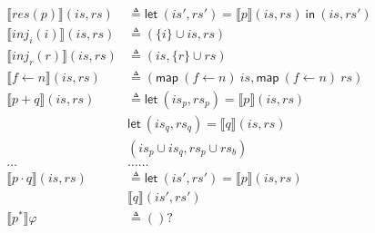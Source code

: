 \documentclass[12pt, letterpaper]{article}
\begin{document}
\begin{align*}
			\\
		\llbracket res(p) \rrbracket(\mathit{is}, \mathit{rs})
			& \triangleq
		\mathsf{let}\ (\mathit{is}',\mathit{rs}')
                = \llbracket p\rrbracket(\mathit{is}, \mathit{rs})\ 
                \mathsf{in}\ (\mathit{is},\mathit{rs}')
			\\
		\llbracket inj_{i}(i) \rrbracket(\mathit{is}, \mathit{rs})
			& \triangleq
			(\{i\} \cup \mathit{is}, \mathit{rs})
			\\
		\llbracket inj_{r}(r) \rrbracket(\mathit{is}, \mathit{rs})
			& \triangleq
			(\mathit{is}, \{r\} \cup \mathit{rs})
			\\
		\llbracket f \leftarrow n \rrbracket(\mathit{is}, \mathit{rs})
			& \triangleq
                (\mathsf{map}\ (f\leftarrow n)\ \mathit{is},
                 \mathsf{map}\ (f\leftarrow n)\ \mathit{rs}) \\
		 \llbracket p + q \rrbracket(\mathit{is}, \mathit{rs})
                 &\triangleq
                 \mathsf{let}\ (\mathit{is}_p,\mathit{rs}_p) =
                 \llbracket p \rrbracket(\mathit{is}, \mathit{rs}) \\
                &\mathsf{let}\ (\mathit{is}_q,\mathit{rs}_q) =
                \llbracket q \rrbracket(\mathit{is}, \mathit{rs}) \\
                &(\mathit{is}_p \cup \mathit{is}_q,\mathit{rs}_p \cup \mathit{rs}_b) \\
		\dots & \dots \dots \\
		\llbracket p \cdot q \rrbracket(\mathit{is}, \mathit{rs})
		&
                \triangleq
                 \mathsf{let}\ (\mathit{is}',\mathit{rs}') =
                 \llbracket p \rrbracket(\mathit{is}, \mathit{rs}) \\
                 &\llbracket q \rrbracket(\mathit{is}', \mathit{rs}') \\
		\llbracket p ^{*} \rrbracket \varphi
			& \triangleq
			()?
			\\
	\end{align*}
\end{document}
